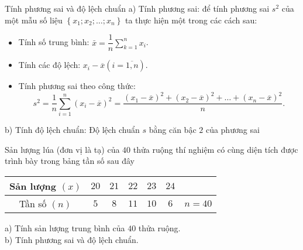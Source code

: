 \begin{dang}{Tính phương sai và độ lệch chuẩn}
	a) Tính phương sai: để tính phương sai $s^{2}$ của một mẫu số liệu $\left\{x_{1}; x_{2}; \ldots ; x_{n}\right\}$ ta thực hiện một trong các cách sau:\\
	\begin{itemize}
		\item Tính số trung bình:
		$\bar{x}=\dfrac{1}{n} \displaystyle\sum\limits_{k=1}^{n} x_{i}$.
		\item Tính các độ lệch:
		$x_{i}-\overline{x}(i=\overline{1, n})$.
		\item Tính phương sai theo công thức:
		$$s^{2}=\dfrac{1}{n} \displaystyle\sum\limits_{i=1}^{n}\left(x_{i}-\overline{x}\right)^{2}=\dfrac{\left(x_{1}-\overline{x}\right)^{2}+\left(x_{2}-\overline{x}\right)^{2}+\ldots+\left(x_{n}-\overline{x}\right)^{2}}{n}.$$
	\end{itemize}
	b) Tính độ lệch chuẩn: Độ lệch chuẩn $s$ bằng căn bậc $2$ của phương sai
\end{dang}
\viduminhhoa	
\begin{vd}%
	Sản lượng lúa (đơn vị là tạ) của $40$ thửa ruộng thí nghiệm có cùng diện tích được trình bày trong bảng tần số sau đây
	\begin{center}
		\begin{tabular}{|c|c|c|c|c|c|c|}
			\hline
			Sản lượng $(x)$ & $20$ & $21$ & $22$ & $23$ & $24$ &      \\ \hline
			Tần số $(n)$    & $5$  & $8$  & $11$ & $10$ & $6$  & $n=40$ \\ \hline
		\end{tabular}
	\end{center}
	a) Tính sản lượng trung bình của $40$ thửa ruộng.\\
	b) Tính phương sai và độ lệch chuẩn.
\end{vd}

